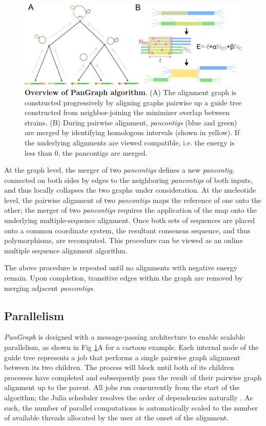 \documentclass[aps,rmp,reprint,superscriptaddress,notitlepage,10pt]{revtex4-1}
\begin{document}
\begin{figure}[htb]
    \includegraphics[width=.45\textwidth]{figs/algorithm.png}
    \caption{{\bf Overview of PanGraph algorithm}.
        (A) The alignment graph is constructed progressively by aligning graphs pairwise up a guide tree constructed from neighbor-joining the minimizer overlap between strains.
        (B) During pairwise alignment, \emph{pancontigs} (blue and green)
        are merged by identifying homologous intervals (shown in yellow).
        If the underlying alignments are viewed compatible, i.e. the energy is less than 0, the pancontigs are merged.
    }
    \label{fig:visualization}
\end{figure}

At the graph level, the merger of two \emph{pancontigs} defines a new \emph{pancontig}, connected on both sides by edges to the neighboring \emph{pancontigs} of both inputs, and thus locally collapses the two graphs under consideration.
At the nucleotide level, the pairwise alignment of two \emph{pancontigs} maps the reference of one onto the other; the merger of two \emph{pancontigs} requires the application of the map onto the underlying multiple-sequence alignment.
Once both sets of sequences are placed onto a common coordinate system, the resultant consensus sequence, and thus polymorphisms, are recomputed.
This procedure can be viewed as an online multiple sequence alignment algorithm.

The above procedure is repeated until no alignments with negative energy remain.
Upon completion, transitive edges within the graph are removed by merging adjacent \emph{pancontigs}.

\subsection{Parallelism}
\emph{PanGraph} is designed with a message-passing architecture to enable scalable parallelism, as shown in Fig \ref{fig:visualization}A for a cartoon example.
Each internal node of the guide tree represents a job that performs a single pairwise graph alignment between its two children.
The process will block until both of its children processes have completed and subsequently pass the result of their pairwise graph alignment up to the parent.
All jobs run concurrently from the start of the algorithm; the Julia scheduler resolves the order of dependencies naturally \cite{bezanson2017julia}.
As such, the number of parallel computations is automatically scaled to the number of available threads allocated by the user at the onset of the alignment.
\end{document}
